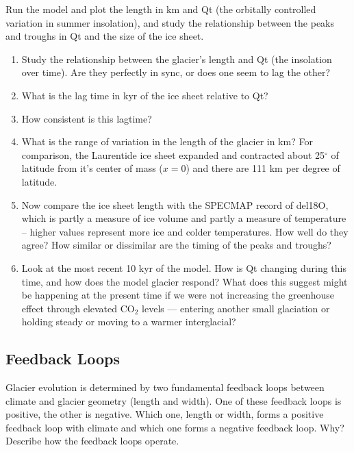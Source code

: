 \documentclass[11pt,letterpaper]{article}
\begin{document}
Run the model and plot the length in km and Qt (the orbitally controlled variation in summer insolation), and study the relationship between the peaks and troughs in Qt and the size of the ice sheet.  

\begin{enumerate}[label=(\alph*)]
\item Study the relationship between the glacier’s length and Qt (the insolation over time).  Are they perfectly in sync, or does one seem to lag the other?

\item What is the lag time in kyr of the ice sheet relative to Qt?

\item How consistent is this lagtime?

\item What is the range of variation in the length of the glacier in km? For comparison, the Laurentide ice sheet expanded and contracted about 25$^\circ$ of latitude from it's center of mass ($x=0$) and there are 111 km per degree of latitude.

\item Now compare the ice sheet length with the SPECMAP record of del18O, which is partly a measure of ice volume and partly a measure of temperature -- higher values represent more ice and colder temperatures.  How well do they agree?  How similar or dissimilar are the timing of the peaks and troughs?

\item Look at the most recent 10 kyr of the model.  How is Qt changing during this time, and how does the model glacier respond?  What does this suggest might be happening at the present time if we were not increasing the greenhouse effect through elevated CO$_2$ levels --- entering another small glaciation or holding steady or moving to a warmer interglacial?
\end{enumerate}

\subsection{Feedback Loops}
Glacier evolution is determined by two fundamental feedback loops between climate and glacier geometry (length and width). One of these feedback loops is positive, the other is negative. Which one, length or width, forms a positive feedback loop with climate and which one forms a negative feedback loop. Why? Describe how the feedback loops operate.
\end{document}
